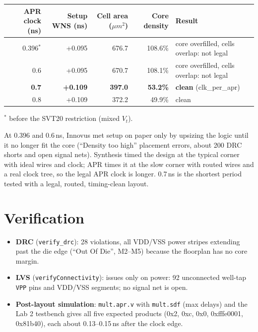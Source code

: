 \documentclass[11pt]{article}
\begin{document}
\begin{center}\small
\begin{tabular}{r|r|r|r|p{4.6cm}}
\hline
APR clock (ns) & Setup WNS (ns) & Cell area ($\mu m^2$) & Core density & Result \\
\hline
0.396$^*$ & +0.095 & 676.7 & 108.6\% & core overfilled, cells overlap: not legal \\
0.6 & +0.095 & 670.7 & 108.1\% & core overfilled, cells overlap: not legal \\
\textbf{0.7} & \textbf{+0.109} & \textbf{397.0} & \textbf{53.2\%} & \textbf{clean} (clk\_per\_apr) \\
0.8 & +0.109 & 372.2 & 49.9\% & clean \\
\hline
\end{tabular}

{\footnotesize $^*$ before the SVT20 restriction (mixed $V_t$).}
\end{center}
At 0.396 and 0.6\,ns, Innovus met setup on paper only by upsizing the logic until it no longer fit
the core (``Density too high'' placement errors, about 200 DRC shorts and open signal nets).
Synthesis timed the design at the typical corner with ideal wires and clock; APR times it at the
slow corner with routed wires and a real clock tree, so the legal APR clock is longer.
0.7\,ns is the shortest period tested with a legal, routed, timing-clean layout.

\section*{Verification}
\begin{itemize}
\item \textbf{DRC} (\texttt{verify\_drc}): 28 violations, all VDD/VSS power stripes extending past the
die edge (``Out Of Die'', M2--M5) because the floorplan has no core margin.
\item \textbf{LVS} (\texttt{verifyConnectivity}): issues only on power: 92 unconnected well-tap
\texttt{VPP} pins and VDD/VSS segments; no signal net is open.
\item \textbf{Post-layout simulation}: \texttt{mult.apr.v} with \texttt{mult.sdf} (max delays)
and the Lab 2 testbench gives all five expected products (0x2, 0xc, 0x0, 0xfffe0001, 0x81b40),
each about 0.13--0.15\,ns after the clock edge.
\end{itemize}
\end{document}
